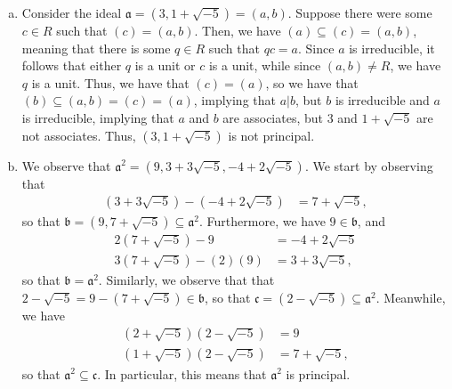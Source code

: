 \documentclass[10pt]{mypackage}
\begin{document}
\begin{solution}
\begin{enumerate}[(a)]
      Furthermore, we have $N\left( 1 \pm \sqrt{-5} \right) = 6$, so if there is a factorization $ab = 1\pm \sqrt{-5}$, then $N(ab) = N(a)N(b) = 6$, so if $N(a) = 6$, then $b = 1$ by the same argument as with $2$, and $N(a)\neq 2,3$, and if $N(a) = 1$, then $a = \pm 1$. In particular, we have that $1\pm \sqrt{-5}$ is irreducible. Since the only units of $R$ are $\pm 1$, it follows that these factorizations are not associate.
    \item Consider the ideal $ \mathfrak{a}= \left( 3,1+\sqrt{-5} \right) = \left( a,b \right)$. Suppose there were some $c\in R$ such that $\left( c \right) = \left( a,b \right)$. Then, we have $\left( a \right)\subseteq \left( c \right) = \left( a,b \right)$, meaning that there is some $q\in R$ such that $qc = a$. Since $a$ is irreducible, it follows that either $q$ is a unit or $c$ is a unit, while since $\left( a,b \right)\neq R$, we have $q$ is a unit. Thus, we have that $\left( c \right) = \left( a \right)$, so we have that $\left( b \right) \subseteq \left( a,b \right) = \left( c \right) = \left( a \right)$, implying that $a | b$, but $b$ is irreducible and $a$ is irreducible, implying that $a$ and $b$ are associates, but $3$ and $1+\sqrt{-5}$ are not associates. Thus, $\left( 3,1+\sqrt{-5} \right)$ is not principal.
    \item We observe that $ \mathfrak{a}^2 = \left( 9,3+3\sqrt{-5},-4 + 2\sqrt{-5} \right) $. We start by observing that
      \begin{align*}
        \left( 3 + 3\sqrt{-5} \right) - \left( -4 + 2\sqrt{-5} \right) &= 7 + \sqrt{-5},
      \end{align*}
      so that $ \mathfrak{b} = \left( 9,7 + \sqrt{-5} \right)\subseteq \mathfrak{a}^2$. Furthermore, we have $9\in \mathfrak{b}$, and
      \begin{align*}
        2\left( 7 + \sqrt{-5} \right) - 9 &= -4 + 2\sqrt{-5}\\
        3\left( 7 + \sqrt{-5} \right) - (2)(9) &= 3 + 3\sqrt{-5},
      \end{align*}
      so that $ \mathfrak{b} = \mathfrak{a}^2 $. Similarly, we observe that that $ 2-\sqrt{-5} = 9 - \left( 7 + \sqrt{-5} \right)\in \mathfrak{b} $, so that $ \mathfrak{c} = \left( 2- \sqrt{-5} \right)\subseteq \mathfrak{a}^2$. Meanwhile, we have
      \begin{align*}
        \left( 2 + \sqrt{-5} \right)\left( 2-\sqrt{-5} \right) &= 9\\
        \left( 1+\sqrt{-5} \right)\left( 2-\sqrt{-5} \right) &= 7 + \sqrt{-5},
      \end{align*}
      so that $ \mathfrak{a}^2 \subseteq \mathfrak{c}$. In particular, this means that $ \mathfrak{a}^2 $ is principal.
  \end{enumerate}
\end{solution}
\end{document}

